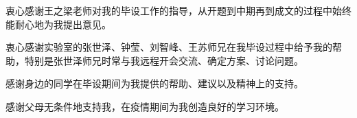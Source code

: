 
\begin{acknowledgements}

    衷心感谢王之梁老师对我的毕设工作的指导，从开题到中期再到成文的过程中始终能耐心地为我提出意见。

    衷心感谢实验室的张世泽、钟莹、刘智峰、王苏师兄在我毕设过程中给予我的帮助，特别是张世泽师兄时常与我远程开会交流、确定方案、讨论问题。

    感谢身边的同学在毕设期间为我提供的帮助、建议以及精神上的支持。

    感谢父母无条件地支持我，在疫情期间为我创造良好的学习环境。
\end{acknowledgements}
